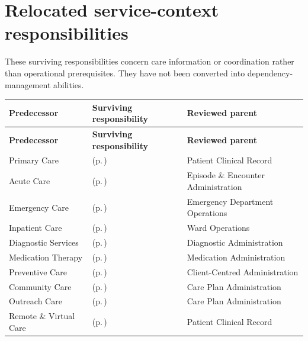 \section{Relocated service-context responsibilities}
These surviving responsibilities concern care information or coordination rather than operational prerequisites. They have not been converted into dependency-management abilities.
\begingroup\small\setlength{\TableWidth}{\dimexpr\linewidth-6\tabcolsep-4\arrayrulewidth\relax}
\begin{longtable}{|>{\raggedright\arraybackslash}p{0.25\TableWidth}|>{\raggedright\arraybackslash}p{0.45\TableWidth}|>{\raggedright\arraybackslash}p{0.3\TableWidth}|}
\hline\rowcolor{TableHead}\textbf{Predecessor} & \textbf{Surviving responsibility} & \textbf{Reviewed parent}\\\hline\endfirsthead
\hline\rowcolor{TableHead}\textbf{Predecessor} & \textbf{Surviving responsibility} & \textbf{Reviewed parent}\\\hline\endhead
\hline\endfoot
Primary Care & \nameref{cap:bec-primary-care} (p.\,\pageref{cap:bec-primary-care}) & Patient Clinical Record\\\hline
Acute Care & \nameref{cap:bec-acute-care} (p.\,\pageref{cap:bec-acute-care}) & Episode \& Encounter Administration\\\hline
Emergency Care & \nameref{cap:bec-emergency-care} (p.\,\pageref{cap:bec-emergency-care}) & Emergency Department Operations\\\hline
Inpatient Care & \nameref{cap:bec-inpatient-care} (p.\,\pageref{cap:bec-inpatient-care}) & Ward Operations\\\hline
Diagnostic Services & \nameref{cap:bec-diagnostic-services} (p.\,\pageref{cap:bec-diagnostic-services}) & Diagnostic Administration\\\hline
Medication Therapy & \nameref{cap:bec-medication-therapy} (p.\,\pageref{cap:bec-medication-therapy}) & Medication Administration\\\hline
Preventive Care & \nameref{cap:bec-preventive-care} (p.\,\pageref{cap:bec-preventive-care}) & Client-Centred Administration\\\hline
Community Care & \nameref{cap:bec-community-care} (p.\,\pageref{cap:bec-community-care}) & Care Plan Administration\\\hline
Outreach Care & \nameref{cap:bec-outreach-care} (p.\,\pageref{cap:bec-outreach-care}) & Care Plan Administration\\\hline
Remote \& Virtual Care & \nameref{cap:bec-remote-virtual-care} (p.\,\pageref{cap:bec-remote-virtual-care}) & Patient Clinical Record\\\hline
\end{longtable}\endgroup
